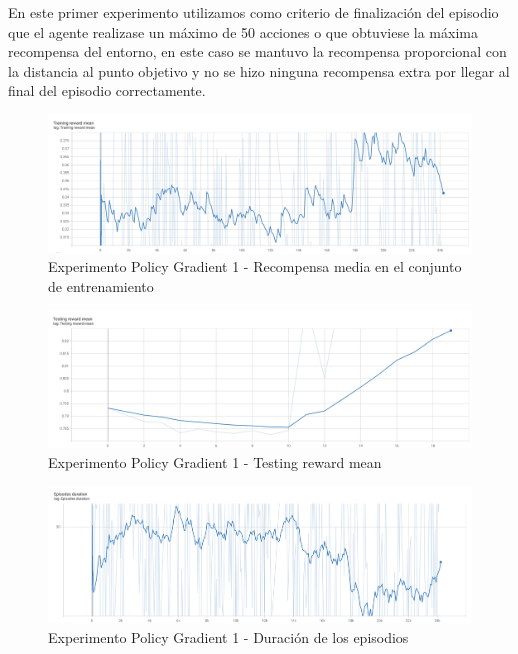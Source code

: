 En este primer experimento utilizamos como criterio de finalización del episodio que el agente realizase un máximo de 50 acciones o que obtuviese la máxima recompensa del entorno, en este caso se mantuvo la recompensa proporcional con la distancia al punto objetivo y no se hizo ninguna recompensa extra por llegar al final del episodio correctamente.
\medskip

\begin{figure}[H]
	\centering
	\includegraphics[width=1\textwidth]{figuras/experiments/policy_gradient/policy_gradient_normalized_image_reward_20_epochs/training_reward_mean.png}
	\caption[Experimento Policy Gradient 1 - Recompensa media en el conjunto de entrenamiento]{Experimento Policy Gradient 1 - Recompensa media en el conjunto de entrenamiento}
	\label{fig-experimento-policy-gradient-1-training-reward-mean}
\end{figure}

\begin{figure}[H]
	\centering
	\includegraphics[width=1\textwidth]{figuras/experiments/policy_gradient/policy_gradient_normalized_image_reward_20_epochs/testing_reward_mean.png}
	\caption[Experimento Policy Gradient 1 - Testing reward mean]{Experimento Policy Gradient 1 - Testing reward mean}
	\label{fig-experimento-policy-gradient-1-testing-reward-mean}
\end{figure}
\begin{figure}[H]
	\centering
	\includegraphics[width=1\textwidth]{figuras/experiments/policy_gradient/policy_gradient_normalized_image_reward_20_epochs/episodes_duration.png}
	\caption[Experimento Policy Gradient 1 - Duración de los episodios]{Experimento Policy Gradient 1 - Duración de los episodios}
	\label{fig-experimento-policy-gradient-1-episodes-duration}
\end{figure}

